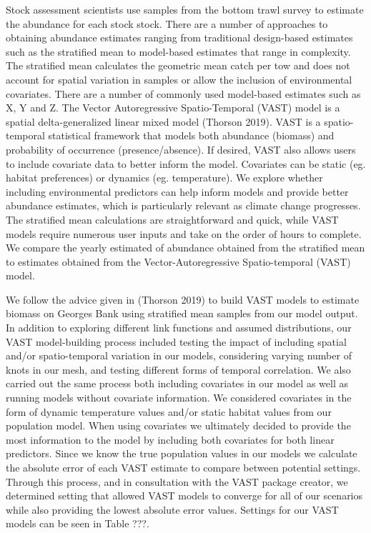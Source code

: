 \documentclass[
  12pt,
]{article}
\begin{document}
Stock assessment scientists use samples from the bottom trawl survey to estimate the abundance for each stock stock. There are a number of approaches to obtaining abundance estimates ranging from traditional design-based estimates such as the stratified mean to model-based estimates that range in complexity. The stratified mean calculates the geometric mean catch per tow and does not account for spatial variation in samples or allow the inclusion of environmental covariates. There are a number of commonly used model-based estimates such as X, Y and Z. The Vector Autoregressive Spatio-Temporal (VAST) model is a spatial delta-generalized linear mixed model (Thorson 2019). VAST is a spatio-temporal statistical framework that models both abundance (biomass) and probability of occurrence (presence/absence). If desired, VAST also allows users to include covariate data to better inform the model. Covariates can be static (eg. habitat preferences) or dynamics (eg. temperature). We explore whether including environmental predictors can help inform models and provide better abundance estimates, which is particularly relevant as climate change progresses. The stratified mean calculations are straightforward and quick, while VAST models require numerous user inputs and take on the order of hours to complete. We compare the yearly estimated of abundance obtained from the stratified mean to estimates obtained from the Vector-Autoregressive Spatio-temporal (VAST) model.

We follow the advice given in (Thorson 2019) to build VAST models to estimate biomass on Georges Bank using stratified mean samples from our model output. In addition to exploring different link functions and assumed distributions, our VAST model-building process included testing the impact of including spatial and/or spatio-temporal variation in our models, considering varying number of knots in our mesh, and testing different forms of temporal correlation. We also carried out the same process both including covariates in our model as well as running models without covariate information. We considered covariates in the form of dynamic temperature values and/or static habitat values from our population model. When using covariates we ultimately decided to provide the most information to the model by including both covariates for both linear predictors. Since we know the true population values in our models we calculate the absolute error of each VAST estimate to compare between potential settings. Through this process, and in consultation with the VAST package creator, we determined setting that allowed VAST models to converge for all of our scenarios while also providing the lowest absolute error values. Settings for our VAST models can be seen in Table ???.
\end{document}

